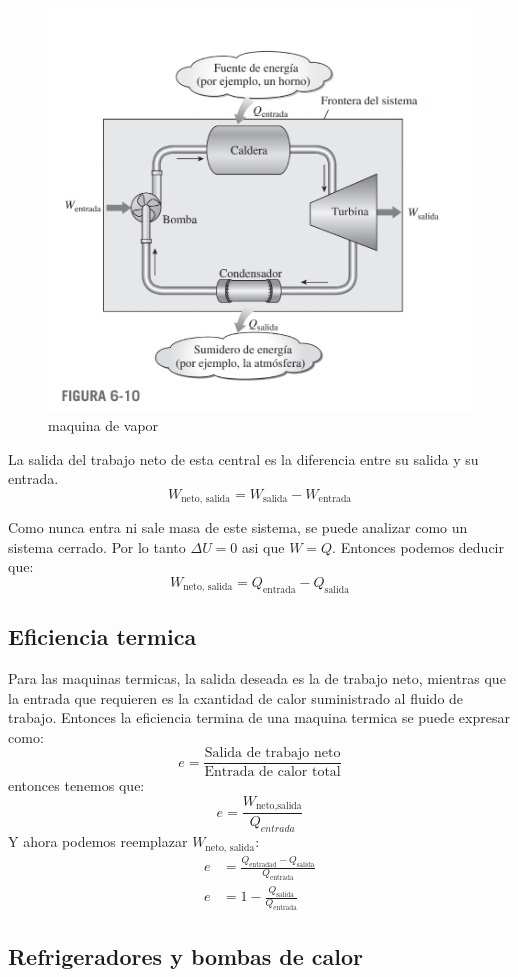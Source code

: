\documentclass[12pt]{article}
\begin{document}
  \begin{figure}[H]
    \centering
    \includegraphics[width=0.5\linewidth]{imagenes/maquina_vapor.jpg}
    \caption{maquina de vapor}
    \label{fig:maq_vapor}
  \end{figure}
  
  La salida del trabajo neto de esta central es la diferencia entre su salida y su entrada.
  \[
  W_{\text{neto, salida}} = W_{\text{salida}} - W_{\text{entrada}}
  \]

  Como nunca entra ni sale masa de este sistema, se puede analizar como un sistema cerrado. Por lo tanto $ \Delta U = 0 $ asi que $ W = Q $. Entonces podemos deducir que:
  \[
  W_{\text{neto, salida}} = Q_{\text{entrada}} - Q_{\text{salida}}
  \]

  \subsection{Eficiencia termica}
  Para las maquinas termicas, la salida deseada es la de trabajo neto, mientras que la entrada que requieren es la cxantidad de calor suministrado al fluido de trabajo. Entonces la eficiencia termina de una maquina termica se puede expresar como:
  \[
  e = \frac{\text{Salida de trabajo neto}}{\text{Entrada de calor total}}
  \]
  entonces tenemos que:
  \[
	  e = \frac{W_{\text{neto,salida}}}{Q_{entrada}}
  \]
  Y ahora podemos reemplazar $ W_{\text{neto, salida}} $:
  \begin{align*}
    e &= \frac{Q_{\text{entradad}} - Q_{\text{salida}}}{Q_{\text{entrada}}}\\
    e &= 1 - \frac{Q_{\text{salida}}}{Q_{\text{entrada}}}
  \end{align*}

  \subsection{Refrigeradores y bombas de calor}
  



  
\end{document}
